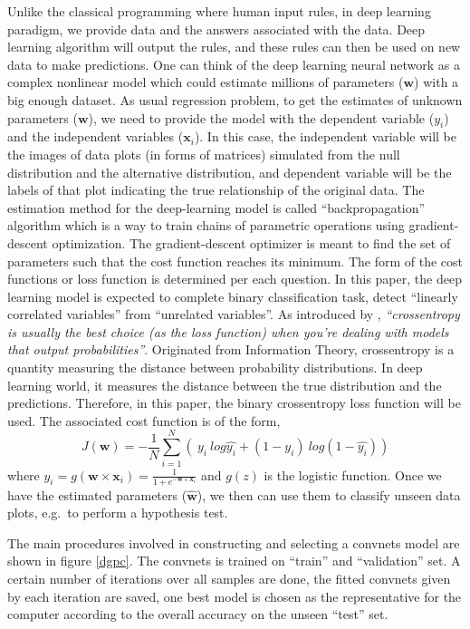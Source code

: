 \documentclass[12pt]{article}
\begin{document}
Unlike the classical programming where human input rules, in deep
learning paradigm, we provide data and the answers associated with the
data. Deep learning algorithm will output the rules, and these rules can
then be used on new data to make predictions. One can think of the deep
learning neural network as a complex nonlinear model which could
estimate millions of parameters (\(\textbf{w}\)) with a big enough
dataset. As usual regression problem, to get the estimates of unknown
parameters (\(\textbf{w}\)), we need to provide the model with the
dependent variable (\(y_i\)) and the independent variables
(\(\textbf{x}_i\)). In this case, the independent variable will be the
images of data plots (in forms of matrices) simulated from the null
distribution and the alternative distribution, and dependent variable
will be the labels of that plot indicating the true relationship of the
original data. The estimation method for the deep-learning model is
called ``backpropagation'' algorithm which is a way to train chains of
parametric operations using gradient-descent optimization. The
gradient-descent optimizer is meant to find the set of parameters such
that the cost function reaches its minimum. The form of the cost
functions or loss function is determined per each question. In this
paper, the deep learning model is expected to complete binary
classification task, detect ``linearly correlated variables'' from
``unrelated variables''. As introduced by \citet{DLR18},
\emph{``crossentropy is usually the best choice (as the loss function)
when you're dealing with models that output probabilities''}. Originated
from Information Theory, crossentropy is a quantity measuring the
distance between probability distributions. In deep learning world, it
measures the distance between the true distribution and the predictions.
Therefore, in this paper, the binary crossentropy loss function will be
used. The associated cost function is of the form,
\[J(\textbf{w})=- \frac{1}{N}\sum_{i=1}^N\left(  
\ y_i\ log\hat{y_i}+(1-y_i)\ log(1-\hat{y_i})  
\right)\] where
\(\hat{y_i} = g(\textbf{w} \times \textbf{x}_i) = \frac{1}{1+e^{-\textbf{w} \times \textbf{x}_i}}\)
and \(g(z)\) is the logistic function. Once we have the estimated
parameters (\(\hat{\textbf{w}}\)), we then can use them to classify
unseen data plots, e.g.~to perform a hypothesis test.

The main procedures involved in constructing and selecting a convnets
model are shown in figure \ref{dgpc}. The convnets is trained on
``train'' and ``validation'' set. A certain number of iterations over
all samples are done, the fitted convnets given by each iteration are
saved, one best model is chosen as the representative for the computer
according to the overall accuracy on the unseen ``test'' set.
\end{document}
